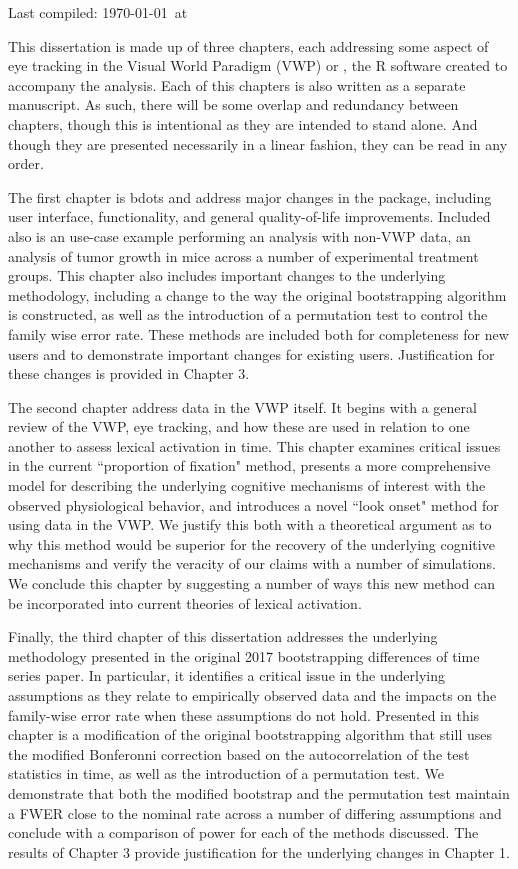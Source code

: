 
Last compiled: \today \  at \currenttime

This dissertation is made up of three chapters, each addressing some aspect of eye tracking in the Visual World Paradigm (VWP) or , the R software created to accompany the analysis. Each of this chapters is also written as a separate manuscript. As such, there will be some overlap and redundancy between chapters, though this is intentional as they are intended to stand alone. And though they are presented necessarily in a linear fashion, they can be read in any order.

The first chapter is bdots and address major changes in the  package, including user interface, functionality, and general quality-of-life improvements. Included also is an use-case example performing an analysis with non-VWP data, an analysis of tumor growth in mice across a number of experimental treatment groups. This chapter also includes important changes to the underlying methodology, including a change to the way the original bootstrapping algorithm is constructed, as well as the introduction of a permutation test to control the family wise error rate. These methods are included both for completeness for new users and to demonstrate important changes for existing users. Justification for these changes is provided in Chapter 3. 

The second chapter address data in the VWP itself. It begins with a general review of the VWP, eye tracking, and how these are used in relation to one another to assess lexical activation in time. This chapter examines critical issues in the current ``proportion of fixation" method, presents a more comprehensive model for describing the underlying cognitive mechanisms of interest with the observed physiological behavior, and introduces a novel ``look onset" method for using data in the VWP. We justify this both with a theoretical argument as to why this method would be superior for the recovery of the underlying cognitive mechanisms and verify the veracity of our claims with a number of simulations. We conclude this chapter by suggesting a number of ways this new method can be incorporated into current theories of lexical activation.

Finally, the third chapter of this dissertation addresses the underlying methodology presented in the original 2017 bootstrapping differences of time series paper. In particular, it identifies a critical issue in the underlying assumptions as they relate to empirically observed data and the impacts on the family-wise error rate when these assumptions do not hold. Presented in this chapter is a modification of the original bootstrapping algorithm that still uses the modified Bonferonni correction based on the autocorrelation of the test statistics in time, as well as the introduction of a permutation test. We demonstrate that both the modified bootstrap and the permutation test maintain a FWER close to the nominal rate across a number of differing assumptions and conclude with a comparison of power for each of the methods discussed. The results of Chapter 3 provide justification for the underlying changes in Chapter 1. 

